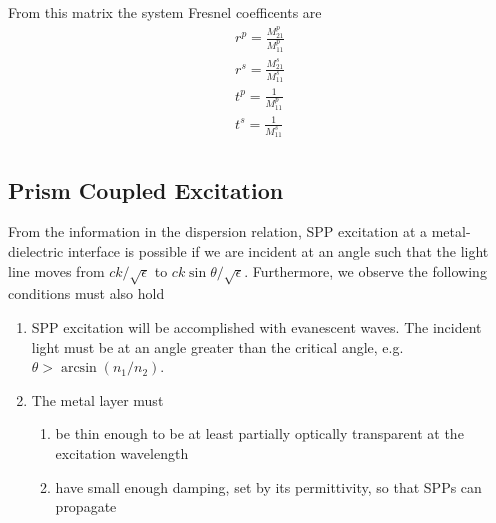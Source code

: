 From this matrix the system Fresnel coefficents are
\begin{align}
r^p = \frac{M^p_{21}}{M^p_{11}}\\
r^s = \frac{M^s_{21}}{M^s_{11}}\\
t^p = \frac{1}{M^p_{11}}\\
t^s = \frac{1}{M^s_{11}}\\
\end{align}

\subsection{Prism Coupled Excitation}
From the information in the dispersion relation, SPP excitation at a
metal-dielectric interface is possible if we are incident at an angle such
that the light line moves from $ck/\sqrt{\epsilon}$ to
$ck\sin\theta/\sqrt{\epsilon}$.  Furthermore, we observe the following
conditions must also hold
\begin{enumerate}
\item SPP excitation will be accomplished with evanescent waves.  The
incident light must be at an angle greater than the critical angle, e.g.
$\theta>\arcsin\left(n_1/n_2\right)$.
\item The metal layer must
\begin{enumerate}
\item be thin enough to be at least partially optically transparent at the excitation wavelength
\item have small enough damping, set by its permittivity, so that SPPs can propagate
\end{enumerate}
\end{enumerate}


